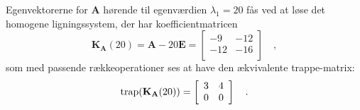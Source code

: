 \begin{example}
Egenvektorerne for $\mathbf{A}$ hørende til egenværdien $\lambda_{1} = 20$ fås ved at løse det homogene ligningssystem, der har koefficientmatricen
\begin{equation}
\mathbf{K}_{\mathbf{A}}(20) = \mathbf{A} - 20\mathbf{E} = \left[
                                                            \begin{array}{cc}
                                                              -9 & -12 \\
                                                              -12 & -16 \\
                                                            \end{array}
                                                          \right]
 \quad ,
\end{equation}
som med passende rækkeoperationer ses at have den ækvivalente trappe-matrix:
\begin{equation}
\mathrm{trap}(\mathbf{K}_{\mathbf{A}}(20)) = \left[
                                       \begin{array}{cc}
                                         3 & 4 \\
                                         0 & 0 \\
                                       \end{array}
                                     \right]
\quad .
\end{equation}


\end{example}
